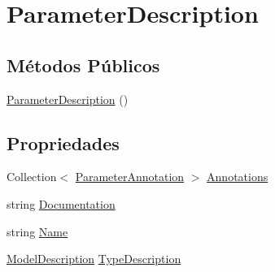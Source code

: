 \hypertarget{classApi3Layers_1_1Areas_1_1HelpPage_1_1ModelDescriptions_1_1ParameterDescription}{}\section{Parameter\+Description}
\label{classApi3Layers_1_1Areas_1_1HelpPage_1_1ModelDescriptions_1_1ParameterDescription}
\subsection*{Métodos Públicos}
\begin{DoxyCompactItemize}
\item 
\hyperlink{classApi3Layers_1_1Areas_1_1HelpPage_1_1ModelDescriptions_1_1ParameterDescription_aefb4a1da3e61b3368645c8f2fd71a50f}{Parameter\+Description} ()
\end{DoxyCompactItemize}
\subsection*{Propriedades}
\begin{DoxyCompactItemize}
\item 
Collection$<$ \hyperlink{classApi3Layers_1_1Areas_1_1HelpPage_1_1ModelDescriptions_1_1ParameterAnnotation}{Parameter\+Annotation} $>$ \hyperlink{classApi3Layers_1_1Areas_1_1HelpPage_1_1ModelDescriptions_1_1ParameterDescription_ae2e50db897fe523b76e76972dfdce1ce}{Annotations}
\item 
string \hyperlink{classApi3Layers_1_1Areas_1_1HelpPage_1_1ModelDescriptions_1_1ParameterDescription_a239e2715951fcab2d9b263ef6acfa899}{Documentation}
\item 
string \hyperlink{classApi3Layers_1_1Areas_1_1HelpPage_1_1ModelDescriptions_1_1ParameterDescription_a7ee9065718e6628dc7791b756fa6c0f9}{Name}
\item 
\hyperlink{classApi3Layers_1_1Areas_1_1HelpPage_1_1ModelDescriptions_1_1ModelDescription}{Model\+Description} \hyperlink{classApi3Layers_1_1Areas_1_1HelpPage_1_1ModelDescriptions_1_1ParameterDescription_a53f61645aec0f2428fcac91ce7db2995}{Type\+Description}
\end{DoxyCompactItemize}


